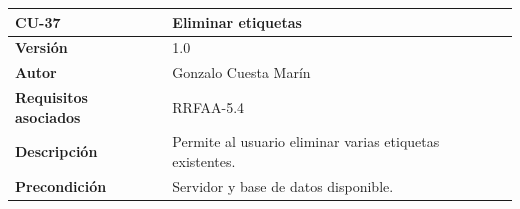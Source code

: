 \documentclass[
]{article}
\begin{document}
\begin{longtable}[]{@{}ll@{}}
\toprule
\begin{minipage}[b]{0.21\columnwidth}\raggedright
\textbf{CU-37}\strut
\end{minipage} & \begin{minipage}[b]{0.74\columnwidth}\raggedright
\textbf{Eliminar etiquetas}\strut
\end{minipage}\tabularnewline
\midrule
\endhead
\begin{minipage}[t]{0.21\columnwidth}\raggedright
\textbf{Versión}\strut
\end{minipage} & \begin{minipage}[t]{0.74\columnwidth}\raggedright
1.0\strut
\end{minipage}\tabularnewline
\begin{minipage}[t]{0.21\columnwidth}\raggedright
\textbf{Autor}\strut
\end{minipage} & \begin{minipage}[t]{0.74\columnwidth}\raggedright
Gonzalo Cuesta Marín\strut
\end{minipage}\tabularnewline
\begin{minipage}[t]{0.21\columnwidth}\raggedright
\textbf{Requisitos asociados}\strut
\end{minipage} & \begin{minipage}[t]{0.74\columnwidth}\raggedright
RRFAA-5.4\strut
\end{minipage}\tabularnewline
\begin{minipage}[t]{0.21\columnwidth}\raggedright
\textbf{Descripción}\strut
\end{minipage} & \begin{minipage}[t]{0.74\columnwidth}\raggedright
Permite al usuario eliminar varias etiquetas existentes.\strut
\end{minipage}\tabularnewline
\begin{minipage}[t]{0.21\columnwidth}\raggedright
\textbf{Precondición}\strut
\end{minipage} & \begin{minipage}[t]{0.74\columnwidth}\raggedright
Servidor y base de datos disponible.


\end{minipage}
\end{longtable}
\end{document}
